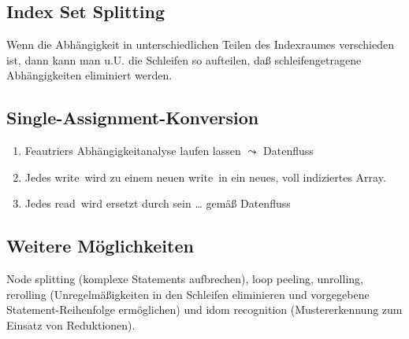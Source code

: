 \subsection{Index Set Splitting}

Wenn die Abhängigkeit in unterschiedlichen Teilen des Indexraumes
verschieden ist, dann kann man u.U. die Schleifen so aufteilen, daß
schleifengetragene Abhängigkeiten eliminiert werden.

\subsection{Single-Assignment-Konversion}

\begin{enumerate}
	\item Feautriers Abhängigkeitanalyse laufen lassen  \( \leadsto \) \glqq Datenfluss\grqq
	\item Jedes \glqq write\grqq\ wird zu einem neuen \glqq write\grqq\ in ein neues, voll indiziertes Array.
	\item Jedes \glqq read\grqq\ wird ersetzt durch sein \dots %
	gemäß Datenfluss
\end{enumerate}

\subsection{Weitere Möglichkeiten}

Node splitting (komplexe Statements aufbrechen), loop peeling,
unrolling, rerolling (Unregelmäßigkeiten in den Schleifen eliminieren
und vorgegebene Statement-Reihenfolge ermöglichen) und idom recognition
(Mustererkennung zum Einsatz von Reduktionen).


\def\ins{\hspace{.5cm}}

